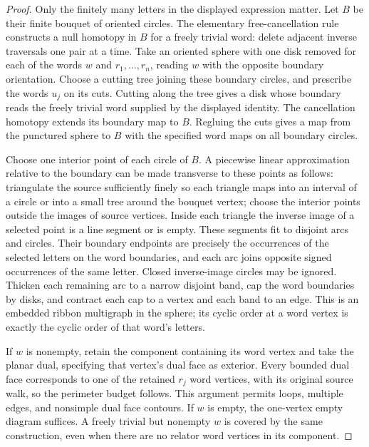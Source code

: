 \begin{proof}
Only the finitely many letters in the displayed expression matter.  Let
$B$ be their finite bouquet of oriented circles.  The elementary
free-cancellation rule constructs a null homotopy in $B$ for a freely
trivial word: delete adjacent inverse traversals one pair at a time.
Take an oriented sphere with one disk removed for each of the words $w$
and $r_1,\ldots,r_n$, reading $w$ with the opposite boundary orientation.
Choose a cutting tree joining these boundary circles, and prescribe the
words $u_j$ on its cuts.  Cutting along the tree gives a disk whose
boundary reads the freely trivial word supplied by the displayed
identity.  The cancellation homotopy extends its boundary map to $B$.
Regluing the cuts gives a map from the punctured sphere to $B$ with the
specified word maps on all boundary circles.

Choose one interior point of each circle of $B$.  A piecewise linear
approximation relative to the boundary can be made transverse to these
points as follows: triangulate the source sufficiently finely so each
triangle maps into an interval of a circle or into a small tree around
the bouquet vertex; choose the interior points outside the images of
source vertices.  Inside each triangle the inverse image of a selected
point is a line segment or is empty.  These segments fit to disjoint arcs
and circles.  Their boundary endpoints are precisely the occurrences of
the selected letters on the word boundaries, and each arc joins opposite
signed occurrences of the same letter.  Closed inverse-image circles may
be ignored.  Thicken each remaining arc to a narrow disjoint band, cap
the word boundaries by disks, and contract each cap to a vertex and each
band to an edge.  This is an embedded ribbon multigraph in the sphere;
its cyclic order at a word vertex is exactly the cyclic order of that
word's letters.

If $w$ is nonempty, retain the component containing its word vertex and
take the planar dual, specifying that vertex's dual face as exterior.
Every bounded dual face corresponds to one of the retained $r_j$ word
vertices, with its original source walk, so the perimeter budget follows.
This argument permits loops, multiple edges, and nonsimple dual face
contours.  If $w$ is empty, the one-vertex empty diagram suffices.  A
freely trivial but nonempty $w$ is covered by the same construction, even
when there are no relator word vertices in its component.


\end{proof}
